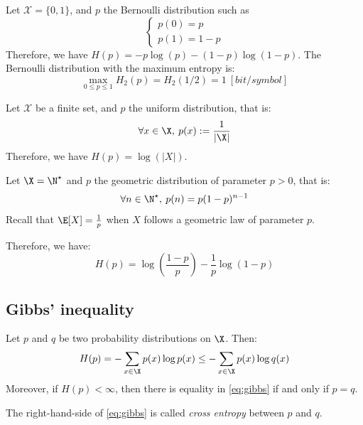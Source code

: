 \documentclass[toc, titlepaged]{../cs-classes/cs-classes}
\begin{document}
\begin{example}
    Let $\mathcal{X}=\{0, 1\}$, and $p$ the Bernoulli distribution such as
    \begin{equation*}
        \begin{cases}
            p(0) = p\\
            p(1) = 1 - p
        \end{cases}
    \end{equation*}
    Therefore, we have $H(p)=-p\log(p) - (1-p)\log(1-p)$. The Bernoulli distribution with the maximum entropy is:
    \begin{equation*}
        \max_{0\leq p\leq 1} H_2(p) = H_2(1/2) = 1 \: [bit/symbol]
    \end{equation*}
\end{example}

\begin{example}
    Let $\mathcal{X}$ be a finite set, and $p$ the uniform distribution, that is:
    \begin{equation*}
        \forall x\in \X, \: p(x) := \frac{1}{|\X|}
    \end{equation*}
    Therefore, we have $H(p) = \log(|X|)$.
\end{example}

\begin{example}
    Let $\X = \N^\star$ and $p$ the geometric distribution of parameter $p>0$, that is:
    \begin{equation*}
        \forall n\in \N^\star, \: p(n) = p(1-p)^{n-1}
    \end{equation*}
    Recall that $\E[X] = \frac{1}{p}$ when $X$ follows a geometric law of parameter $p$.

    Therefore, we have:
    \begin{equation*}
        H(p) = \log\left(\frac{1-p}{p}\right) - \frac{1}{p}\log(1-p)
    \end{equation*}
\end{example}

\subsection{Gibbs' inequality}
\begin{theorem}
    Let $p$ and $q$ be two probability distributions on $\X$. Then:
    \begin{equation}
        \label{eq:gibbs}
        H(p) = -\sum_{x\in\X} p(x)\log p(x)  \leq - \sum_{x\in\X} p(x)\log q(x)
    \end{equation}
    Moreover, if $H(p)<\infty$, then there is equality in \eqref{eq:gibbs} if and only if $p=q$.
\end{theorem}
The right-hand-side of \eqref{eq:gibbs} is called \emph{cross entropy} between $p$ and $q$.
\end{document}
